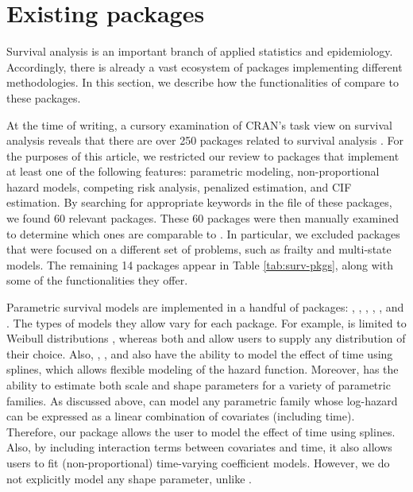 \documentclass[
]{jss}
\begin{document}
\hypertarget{existing-packages}{%
\section{Existing packages}\label{existing-packages}}

Survival analysis is an important branch of applied statistics and
epidemiology. Accordingly, there is already a vast ecosystem of
 packages implementing different methodologies. In this
section, we describe how the functionalities of  compare
to these packages.

At the time of writing, a cursory examination of CRAN's task view on
survival analysis reveals that there are over 250 packages related to
survival analysis \citeyearpar{survTaskView}. For the purposes of this
article, we restricted our review to packages that implement at least
one of the following features: parametric modeling, non-proportional
hazard models, competing risk analysis, penalized estimation, and CIF
estimation. By searching for appropriate keywords in the
 file of these packages, we found 60 relevant
packages. These 60 packages were then manually examined to determine
which ones are comparable to . In particular, we excluded
packages that were focused on a different set of problems, such as
frailty and multi-state models. The remaining 14 packages appear in
Table \ref{tab:surv-pkgs}, along with some of the functionalities they
offer.

Parametric survival models are implemented in a handful of packages:
 \citeyearpar{mahani2015bayesian}, 
\citeyearpar{flexsurv},  \citeyearpar{smoothHazard},
 \citeyearpar{clements_liu}, 
\citeyearpar{scheike2014estimating}, and 
\citeyearpar{survival-package}. The types of models they allow vary for
each package. For example,  is limited to Weibull
distributions \citeyearpar{smoothHazard}, whereas both 
and  allow users to supply any distribution of their
choice. Also, , ,  and
 also have the ability to model the effect of time using
splines, which allows flexible modeling of the hazard function.
Moreover,  has the ability to estimate both scale and
shape parameters for a variety of parametric families. As discussed
above,  can model any parametric family whose log-hazard
can be expressed as a linear combination of covariates (including time).
Therefore, our package allows the user to model the effect of time using
splines. Also, by including interaction terms between covariates and
time, it also allows users to fit (non-proportional) time-varying
coefficient models. However, we do not explicitly model any shape
parameter, unlike .
\end{document}
